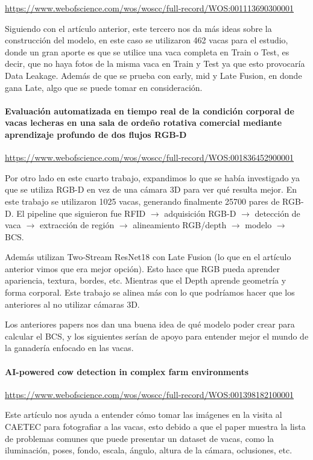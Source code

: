 \url{https://www.webofscience.com/wos/woscc/full-record/WOS:001113690300001}

Siguiendo con el artículo anterior, este tercero nos da más ideas sobre la construcción del modelo, en este caso se utilizaron 462 vacas para el estudio, donde un gran aporte es que se utilice una vaca completa en Train o Test, es decir, que no haya fotos de la misma vaca en Train y Test ya que esto provocaría Data Leakage. Además de que se prueba con early, mid y Late Fusion, en donde gana Late, algo que se puede tomar en consideración.

\paragraph{Evaluación automatizada en tiempo real de la condición corporal de vacas lecheras en una sala de ordeño rotativa comercial mediante aprendizaje profundo de dos flujos RGB-D}

\url{https://www.webofscience.com/wos/woscc/full-record/WOS:001836452900001}

Por otro lado en este cuarto trabajo, expandimos lo que se había investigado ya que se utiliza RGB-D en vez de una cámara 3D para ver qué resulta mejor. En este trabajo se utilizaron 1025 vacas, generando finalmente 25700 pares de RGB-D. El pipeline que siguieron fue RFID $\rightarrow$ adquisición RGB-D $\rightarrow$ detección de vaca $\rightarrow$ extracción de región $\rightarrow$ alineamiento RGB/depth $\rightarrow$ modelo $\rightarrow$ BCS.

Además utilizan Two-Stream ResNet18 con Late Fusion (lo que en el artículo anterior vimos que era mejor opción). Esto hace que RGB pueda aprender apariencia, textura, bordes, etc. Mientras que el Depth aprende geometría y forma corporal. Este trabajo se alinea más con lo que podríamos hacer que los anteriores al no utilizar cámaras 3D.

Los anteriores papers nos dan una buena idea de qué modelo poder crear para calcular el BCS, y los siguientes serían de apoyo para entender mejor el mundo de la ganadería enfocado en las vacas.

\paragraph{AI-powered cow detection in complex farm environments}

\url{https://www.webofscience.com/wos/woscc/full-record/WOS:001398182100001}

Este artículo nos ayuda a entender cómo tomar las imágenes en la visita al CAETEC para fotografiar a las vacas, esto debido a que el paper muestra la lista de problemas comunes que puede presentar un dataset de vacas, como la iluminación, poses, fondo, escala, ángulo, altura de la cámara, oclusiones, etc.


